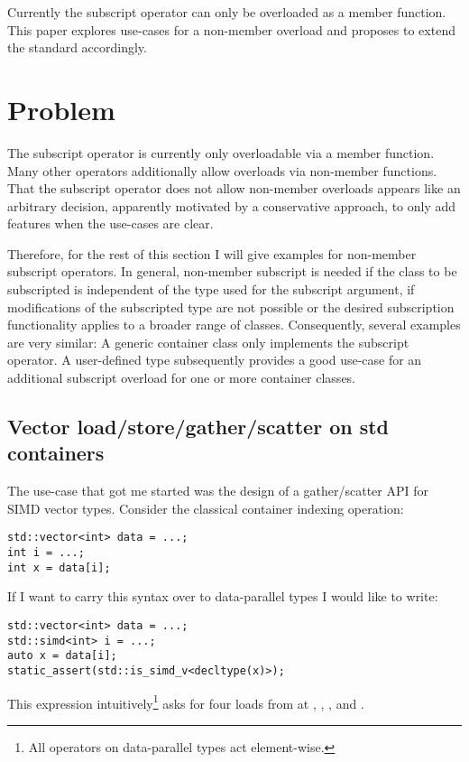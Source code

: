 \newcommand\wgTitle{Non-Member Subscript Operator}
\newcommand\wgName{Matthias Kretz <m.kretz@gsi.de>}
\newcommand\wgDocumentNumber{DNMSOR0}
\newcommand\wgGroup{EWG-I}
\newcommand\wgTarget{\CC{}23}

\usepackage{mymacros}
\usepackage{wg21}


\newlength\myIndent

\begin{wgTitlepage}
  Currently the subscript operator can only be overloaded as a member function.
  This paper explores use-cases for a non-member overload and proposes to extend
  the standard accordingly.
\end{wgTitlepage}

\section{Problem}
The subscript operator is currently only overloadable via a member function.
Many other operators additionally allow overloads via non\hyp member functions.
That the subscript operator does not allow non\hyp member overloads appears like an arbitrary decision, apparently motivated by a conservative approach, to only add features when the use\hyp cases are clear.

Therefore, for the rest of this section I will give examples for non\hyp member subscript operators.
In general, non\hyp member subscript is needed if the class to be subscripted is independent of the type used for the subscript argument, if modifications of the subscripted type are not possible or the desired subscription functionality applies to a broader range of classes.
Consequently, several examples are very similar:
A generic container class only implements the  subscript operator.
A user-defined type subsequently provides a good use\hyp case for an additional subscript overload for one or more container classes.

\subsection{Vector load/store/gather/scatter on std containers}
\label{sec:simd_load}
The use\hyp case that got me started was the design of a gather/scatter API for SIMD vector types.
Consider the classical container indexing operation:
\smallskip\begin{lstlisting}
std::vector<int> data = ...;
int i = ...;
int x = data[i];
\end{lstlisting}
If I want to carry this syntax over to data\hyp parallel types I would like to write:
\smallskip\begin{lstlisting}
std::vector<int> data = ...;
std::simd<int> i = ...;
auto x = data[i];
static_assert(std::is_simd_v<decltype(x)>);
\end{lstlisting}
This expression intuitively\footnote{All operators on data-parallel types act element-wise.} asks for four loads from  at , , , and .

